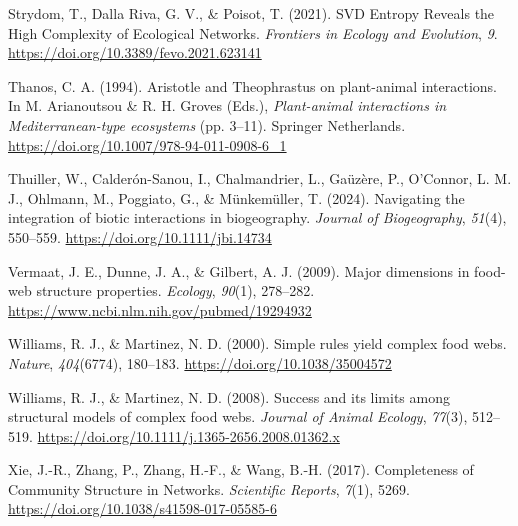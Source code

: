 \documentclass[
]{article}
\newlength{\cslhangindent}
\newenvironment{CSLReferences}[2] %
 {\begin{list}{}{%
  \setlength{\itemindent}{0pt}
  \setlength{\leftmargin}{0pt}
  \setlength{\parsep}{0pt}
  \ifodd #1
   \setlength{\leftmargin}{\cslhangindent}
   \setlength{\itemindent}{-1\cslhangindent}
  \fi
  \setlength{\itemsep}{#2\baselineskip}}}
 {\end{list}}
\begin{document}
\begin{CSLReferences}{1}{0}
Strydom, T., Dalla Riva, G. V., \& Poisot, T. (2021). {SVD Entropy
Reveals} the {High Complexity} of {Ecological Networks}. \emph{Frontiers
in Ecology and Evolution}, \emph{9}.
\url{https://doi.org/10.3389/fevo.2021.623141}

Thanos, C. A. (1994). Aristotle and {Theophrastus} on plant-animal
interactions. In M. Arianoutsou \& R. H. Groves (Eds.),
\emph{Plant-animal interactions in {Mediterranean-type} ecosystems} (pp.
3--11). Springer Netherlands.
\url{https://doi.org/10.1007/978-94-011-0908-6_1}

Thuiller, W., Calderón-Sanou, I., Chalmandrier, L., Gaüzère, P.,
O'Connor, L. M. J., Ohlmann, M., Poggiato, G., \& Münkemüller, T.
(2024). Navigating the integration of biotic interactions in
biogeography. \emph{Journal of Biogeography}, \emph{51}(4), 550--559.
\url{https://doi.org/10.1111/jbi.14734}

Vermaat, J. E., Dunne, J. A., \& Gilbert, A. J. (2009). Major dimensions
in food-web structure properties. \emph{Ecology}, \emph{90}(1),
278--282. \url{https://www.ncbi.nlm.nih.gov/pubmed/19294932}

Williams, R. J., \& Martinez, N. D. (2000). Simple rules yield complex
food webs. \emph{Nature}, \emph{404}(6774), 180--183.
\url{https://doi.org/10.1038/35004572}

Williams, R. J., \& Martinez, N. D. (2008). Success and its limits among
structural models of complex food webs. \emph{Journal of Animal
Ecology}, \emph{77}(3), 512--519.
\url{https://doi.org/10.1111/j.1365-2656.2008.01362.x}

Xie, J.-R., Zhang, P., Zhang, H.-F., \& Wang, B.-H. (2017). Completeness
of {Community Structure} in {Networks}. \emph{Scientific Reports},
\emph{7}(1), 5269. \url{https://doi.org/10.1038/s41598-017-05585-6}

\end{CSLReferences}
\end{document}
